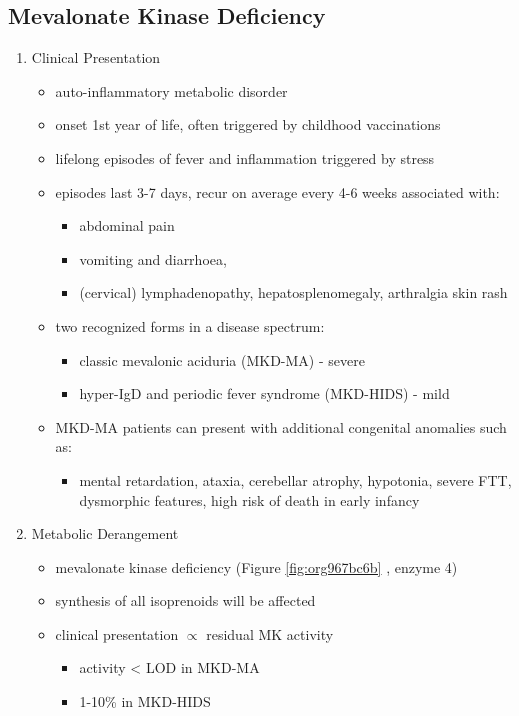 \documentclass{scrartcl}
\begin{document}
\subsection{Mevalonate Kinase Deficiency}
\label{sec:orga64f7f1}
\begin{enumerate}
\item Clinical Presentation
\label{sec:org0b8d63c}
\begin{itemize}
\item auto-inflammatory metabolic disorder
\item onset 1st year of life, often triggered by childhood vaccinations
\item lifelong episodes of fever and inflammation triggered by stress
\item episodes last 3-7 days, recur on average every 4-6 weeks associated with:
\begin{itemize}
\item abdominal pain
\item vomiting and diarrhoea,
\item (cervical) lymphadenopathy, hepatosplenomegaly, arthralgia skin rash
\end{itemize}
\item two recognized forms in a disease spectrum:
\begin{itemize}
\item classic mevalonic aciduria (MKD-MA) - severe
\item hyper-IgD and periodic fever syndrome (MKD-HIDS) - mild
\end{itemize}

\item MKD-MA patients can present with additional congenital anomalies
such as:
\begin{itemize}
\item mental retardation, ataxia, cerebellar atrophy, hypotonia, severe
FTT, dysmorphic features, high risk of death in early infancy
\end{itemize}
\end{itemize}

\item Metabolic Derangement
\label{sec:orgbba0f37}
\begin{itemize}
\item mevalonate kinase deficiency (Figure \ref{fig:org967bc6b} , enzyme 4)
\end{itemize}
\begin{itemize}
\item synthesis of all isoprenoids will be affected
\item clinical presentation \(\propto\) residual MK activity
\begin{itemize}
\item activity < LOD in MKD-MA
\item 1-10\% in MKD-HIDS
\end{itemize}
\end{itemize}


\end{enumerate}
\end{document}
